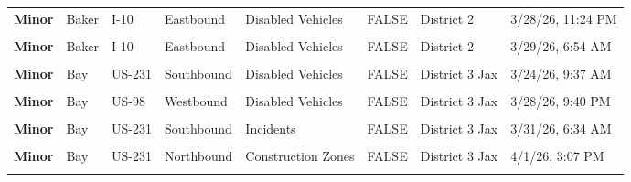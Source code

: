 \documentclass[
]{article}
\begin{document}
\begin{longtable}[t]{>{\raggedright\arraybackslash}p{1.5cm}>{\raggedright\arraybackslash}p{2.5cm}>{\raggedright\arraybackslash}p{3cm}>{\raggedright\arraybackslash}p{1.8cm}>{\raggedright\arraybackslash}p{2.5cm}lll}
\textbf{Minor} & Baker & I-10 & Eastbound & Disabled Vehicles & FALSE & District 2 & 3/28/26, 11:24 PM\\
\textbf{\cellcolor{gray!10}{Minor}} & \cellcolor{gray!10}{Baker} & \cellcolor{gray!10}{I-10} & \cellcolor{gray!10}{Westbound} & \cellcolor{gray!10}{Incidents} & \cellcolor{gray!10}{FALSE} & \cellcolor{gray!10}{District 2} & \cellcolor{gray!10}{3/29/26, 1:28 AM}\\
\textbf{Minor} & Baker & I-10 & Eastbound & Disabled Vehicles & FALSE & District 2 & 3/29/26, 6:54 AM\\
\textbf{\cellcolor{gray!10}{Minor}} & \cellcolor{gray!10}{Bay} & \cellcolor{gray!10}{US-231} & \cellcolor{gray!10}{Northbound} & \cellcolor{gray!10}{Disabled Vehicles} & \cellcolor{gray!10}{FALSE} & \cellcolor{gray!10}{District 3 Jax} & \cellcolor{gray!10}{3/21/26, 1:59 AM}\\
\addlinespace
\textbf{Minor} & Bay & US-231 & Southbound & Disabled Vehicles & FALSE & District 3 Jax & 3/24/26, 9:37 AM\\
\textbf{\cellcolor{gray!10}{Minor}} & \cellcolor{gray!10}{Bay} & \cellcolor{gray!10}{US-231} & \cellcolor{gray!10}{Northbound} & \cellcolor{gray!10}{Disabled Vehicles} & \cellcolor{gray!10}{FALSE} & \cellcolor{gray!10}{District 3 Jax} & \cellcolor{gray!10}{3/24/26, 10:25 AM}\\
\textbf{Minor} & Bay & US-98 & Westbound & Disabled Vehicles & FALSE & District 3 Jax & 3/28/26, 9:40 PM\\
\textbf{\cellcolor{gray!10}{Minor}} & \cellcolor{gray!10}{Bay} & \cellcolor{gray!10}{US-231} & \cellcolor{gray!10}{Northbound} & \cellcolor{gray!10}{Disabled Vehicles} & \cellcolor{gray!10}{FALSE} & \cellcolor{gray!10}{District 3 Jax} & \cellcolor{gray!10}{3/28/26, 7:03 PM}\\
\textbf{Minor} & Bay & US-231 & Southbound & Incidents & FALSE & District 3 Jax & 3/31/26, 6:34 AM\\
\addlinespace
\textbf{\cellcolor{gray!10}{Minor}} & \cellcolor{gray!10}{Bay} & \cellcolor{gray!10}{US-231} & \cellcolor{gray!10}{Northbound} & \cellcolor{gray!10}{Construction Zones} & \cellcolor{gray!10}{FALSE} & \cellcolor{gray!10}{District 3 Jax} & \cellcolor{gray!10}{3/31/26, 3:11 PM}\\
\textbf{Minor} & Bay & US-231 & Northbound & Construction Zones & FALSE & District 3 Jax & 4/1/26, 3:07 PM\\
\textbf{\cellcolor{gray!10}{Minor}} & \cellcolor{gray!10}{Brevard} & \cellcolor{gray!10}{I-95} & \cellcolor{gray!10}{Southbound} & \cellcolor{gray!10}{Congestion} & \cellcolor{gray!10}{FALSE} & \cellcolor{gray!10}{District 5} & \cellcolor{gray!10}{3/18/26, 6:18 PM}\\

\end{longtable}
\end{document}
